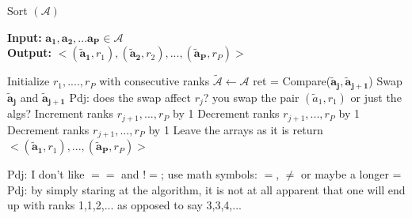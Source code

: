 \documentclass[conference]{IEEEtran}
\newcommand{\p}[1]{{\color{blue} Pdj: #1}}
\begin{document}

\begin{algorithm}
	\caption{Sort $(\mathcal{A})$ }
	\label{alg:sort}
	\hspace*{\algorithmicindent} \textbf{Input: } $ \mathbf{a_1},\mathbf{a_2},...\mathbf{a_P} \in \mathcal{A}$ \\
	\hspace*{\algorithmicindent} \textbf{Output: } $ < (\mathbf{\tilde{a}_1},r_1), (\mathbf{\tilde{a}_2}, r_2), ..., (\mathbf{\tilde{a}_P},r_P) > $
	\begin{algorithmic}[1] 
		\State Initialize $r_1,....,r_P$ with consecutive ranks 
		\State $\tilde{\mathcal{A}} \leftarrow \mathcal{A}$
		\State ret = Compare($\mathbf{\tilde{a}_j}, \mathbf{\tilde{a}_{j+1}}$)
		\State Swap $\mathbf{\tilde{a}_{j}}$ and $\mathbf{\tilde{a}_{j+1}}$
                       \p{does the swap affect $r_j$? you swap the pair $(\tilde{a}_1,r_1)$ or just the algs?}
		\State Increment ranks $r_{j+1}, ..., r_P$ by 1
		\EndIf
		\Else
		\State Decrement ranks $r_{j+1}, ..., r_P$ by 1
		\EndIf
		\EndIf
		\State Decrement ranks $r_{j+1}, ..., r_P$ by 1
		\EndIf
		\State Leave the arrays as it is
		\EndIf		
		\EndFor
		\EndFor
		\State return $< (\mathbf{\tilde{a}_1},r_1), ..., (\mathbf{\tilde{a}_P},r_P) >$
              \end{algorithmic}
              \p{I don't like $==$ and $!=$; use math symbols: $=$, $\ne$ or maybe a longer =}
              \p{by simply staring at the algorithm, it is not at all apparent that one will end up with ranks
                1,1,2,... as opposed to say 3,3,4,...}
\end{algorithm}
\end{document}

